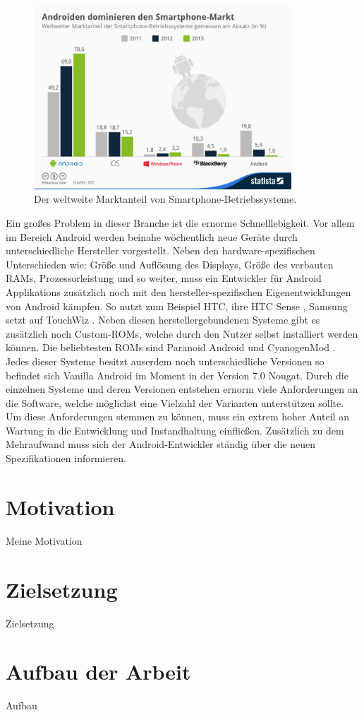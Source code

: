 \begin{figure}[H]
	\begin{center}
		\includegraphics[width=0.86\textwidth]{images/os.jpg}
		\caption{Der weltweite Marktanteil von Smartphone-Betriebssysteme. \cite{os}}
		\label{fig:os_fig}
	\end{center}
\end{figure}

Ein großes Problem in dieser Branche ist die ernorme Schnelllebigkeit. Vor allem im Bereich Android werden beinahe wöchentlich neue Geräte durch unterschiedliche Hersteller vorgestellt. Neben den hardware-spezifischen Unterschieden wie: Größe und Auflösung des Displays, Größe des verbauten RAMs, Prozessorleistung und so weiter, muss ein Entwickler für Android Applikations zusätzlich noch mit den hersteller-spezifischen Eigenentwicklungen von Android kämpfen. So nutzt zum Beispiel HTC, ihre HTC Sense \cite{htc_sense}, Samsung setzt auf TouchWiz \cite{touchwiz}. Neben diesen herstellergebundenen Systeme gibt es zusätzlich noch Custom-ROMs, welche durch den Nutzer selbst installiert werden können. Die beliebtesten ROMs sind Paranoid Android und CyanogenMod \cite{rom}. Jedes dieser Systeme besitzt auserdem noch unterschiedliche Versionen so befindet sich Vanilla Android im Moment in der Version 7.0 Nougat.
Durch die einzelnen Systeme und deren Versionen entstehen ernorm viele Anforderungen an die Software, welche möglichst eine Vielzahl der Varianten unterstützen sollte. Um diese Anforderungen stemmen zu können, muss ein extrem hoher Anteil an Wartung in die Entwicklung und Instandhaltung einfließen. Zusätzlich zu dem Mehraufwand muss sich der Android-Entwickler ständig über die neuen Spezifikationen informieren.
\section{Motivation}\label{sec:motivation}
Meine Motivation
\section{Zielsetzung}\label{sec:target}
Zielsetzung
\section{Aufbau der Arbeit}\label{sec:structure}
Aufbau